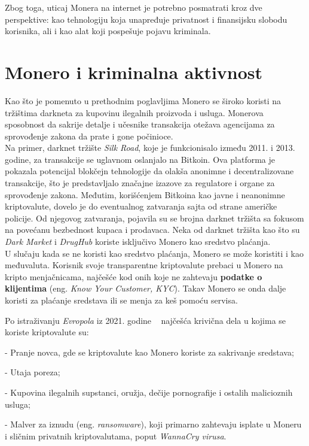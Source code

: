 \documentclass[12pt,a4paper]{article}
\begin{document}
Zbog toga, uticaj Monera na internet je potrebno posmatrati kroz dve perspektive: kao tehnologiju koja unapređuje privatnost i finansijsku slobodu korisnika, ali i kao alat koji pospešuje pojavu kriminala.


\newpage
\section{Monero i kriminalna aktivnost}
Kao što je pomenuto u prethodnim poglavljima Monero se široko koristi na tržištima darkneta za kupovinu ilegalnih proizvoda i usluga. Monerova sposobnost da sakrije detalje i učesnike transakcija otežava agencijama za sprovođenje zakona da prate i gone počinioce.\\

Na primer, darknet tržište \textit{Silk Road}, koje je funkcionisalo između 2011. i 2013. godine, za transakcije se uglavnom oslanjalo na Bitkoin. Ova platforma je pokazala potencijal blokčejn tehnologije da olakša anonimne i decentralizovane transakcije, što je predstavljalo značajne izazove za regulatore i organe za sprovođenje zakona. Međutim, korišćenjem Bitkoina kao javne i neanonimne kriptovalute, dovelo je do eventualnog zatvaranja sajta od strane američke policije. Od njegovog zatvaranja, pojavila su se brojna darknet tržišta sa fokusom na povećanu bezbednost kupaca i prodavaca. Neka od darknet tržišta kao što su \textit{Dark Market} i \textit{DrugHub} koriste isključivo Monero kao sredstvo plaćanja.\\ 

U slučaju kada se ne koristi kao sredstvo plaćanja, Monero se može koristiti i kao međuvaluta. Korisnik svoje transparentne kriptovalute prebaci u Monero na kripto menjačnicama, najčešće kod onih koje ne zahtevaju \textbf{podatke o klijentima} (eng. \textit{Know Your Customer, KYC}). Takav Monero se onda dalje koristi za plaćanje sredstava ili se menja za keš pomoću servisa.

Po istraživanju \textit{Evropola} iz 2021. godine ~\cite{europol} najčešća krivična dela u kojima se koriste kriptovalute su:

    -	Pranje novca, gde se kriptovalute kao Monero koriste za sakrivanje sredstava;
    
    -	Utaja poreza;
    
    -	Kupovina ilegalnih supstanci, oružja, dečije pornografije i ostalih malicioznih usluga;
    
    -	Malver za iznudu (eng. \textit{ransomware}), koji primarno zahtevaju isplate u Moneru i sličnim privatnih kriptovalutama, poput \textit{WannaCry virusa}.
    
\end{document}
